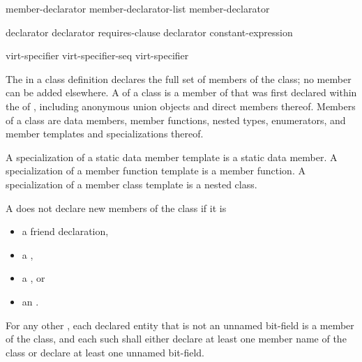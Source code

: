 \begin{bnf}
\br
    member-declarator\br
    member-declarator-list \terminal{,} member-declarator
\end{bnf}

\begin{bnf}
\br
    declarator  \br
    declarator requires-clause\br
    declarator \br
      \terminal{:} constant-expression 
\end{bnf}

\begin{bnf}
\br
    virt-specifier\br
    virt-specifier-seq virt-specifier
\end{bnf}

\begin{bnf}
\br
    \br
\end{bnf}

\begin{bnf}
\br
\end{bnf}

\pnum
{}%
The  in a class definition declares the
full set of members of the class; no member can be added elsewhere.
A  of a class  is a member of 
that was first declared within the  of ,
including anonymous union objects and direct members thereof.
Members of a class are data members, member
functions, nested types, enumerators,
and member templates and specializations thereof.
\begin{note}
A specialization of a static data member template is a static data member.
A specialization of a member function template is a member function.
A specialization of a member class template is a nested class.
\end{note}

\pnum
A  does not declare new members of the class
if it is
\begin{itemize}
\item a friend declaration,
\item a ,
\item a , or
\item an .
\end{itemize}
For any other ,
each declared entity
that is not an unnamed bit-field
is a member of the class,
and each such 
shall either
declare at least one member name of the class
or declare at least one unnamed bit-field.

